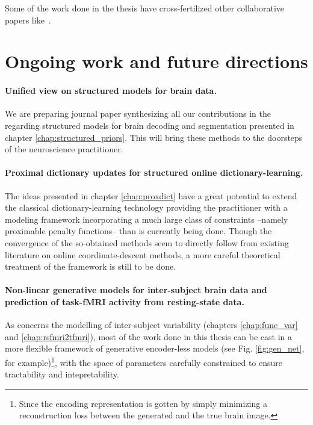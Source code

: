 Some of the work done in the thesis have cross-fertilized other collaborative papers like~\citep{rahim2015integrating,thirion2014fmri}.


\section{Ongoing work and future directions}
\paragraph{Unified view on structured models for brain data.}
We are preparing journal paper synthesizing all our contributions in the regarding structured models for brain decoding and segmentation presented in chapter \ref{chap:structured_priors}. This will bring these methods to the doorsteps of the neuroscience practitioner.
\paragraph{Proximal dictionary updates for structured online dictionary-learning.}
The ideas presented in chapter \ref{chap:proxdict} have a great potential to extend the classical dictionary-learning technology providing the practitioner with a modeling framework incorporating
a much large class of constraints --namely proximable penalty functions-- than is currently being done. Though the convergence of the so-obtained methods seem to directly follow from existing literature on online coordinate-descent methods, a more careful theoretical treatment of the framework is still to be done.
\paragraph{Non-linear generative models for inter-subject brain data and prediction of task-fMRI activity from resting-state data.}
As concerns the modelling of inter-subject variability (chapters \ref{chap:func_var} and \ref{chap:rsfmri2tfmri}), most of the work done in this thesis can be cast in a more flexible framework of generative encoder-less models (see Fig. \ref{fig:gen_net}, for example)\footnote{Since the encoding representation is gotten by simply minimizing a reconstruction loss between the generated and the true brain image.}, with the space of parameters carefully constrained to ensure tractability and intepretability.
  


